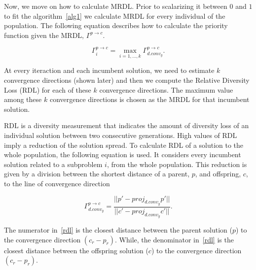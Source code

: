 Now, we move on how to calculate MRDL. Prior to scalarizing it between $0$ and $1$ to fit the algorithm~\ref{alg1} we calculate MRDL for every individual of the population. The following equation describes how to calculate the priority function given the MRDL, $\Gamma^{p \rightarrow c}$.


\vspace{-1em}
\begin{equation}
\Gamma_{i}^{p \rightarrow c} = \underset{i=1,...,k}{\max} \Gamma_{d.conv_{y}}^{p \rightarrow c}.
\end{equation}

%


At every iteraction and each incumbent solution, we need to estimate $k$ convergence directions (shown later)  and then we compute the Relative Diversity Loss (RDL) for each of these $k$ convergence directions. The maximum value among  these $k$ convergence directions is chosen as the MRDL for that incumbent solution.

 RDL is a diversity measurement  that indicates the amount of diversity loss of an individual solution between two consecutive generations. High values of RDL imply a reduction of the solution spread.  To calculate RDL of a solution to the whole population, the following equation is used. It considers every incumbent solution related to a subproblem $i$, from the whole population. This reduction is given by a division between the shortest distance of a parent, $p$,  and offspring, $c$, to the line of convergence direction

\begin{equation}
\label{rdl}
\Gamma_{d.conv_{y}}^{p \rightarrow c} = \dfrac{ ||p \prime - proj_{d.conv_{y}}p \prime|| }{||c \prime - proj_{d.conv_{y}}c \prime||}.
\end{equation}

The numerator in~\ref{rdl} is the closest distance between the parent solution ($p$) to the convergence direction $(c_r - p_r)$. While, the denominator in~\ref{rdl} is the closest distance between the offspring solution ($c$) to the convergence direction $(c_r - p_r)$. %

